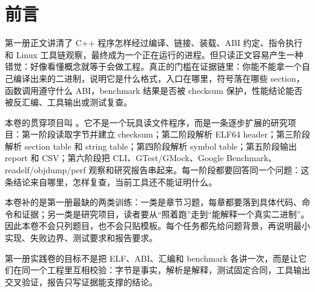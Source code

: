 \chapter*{前言}

第一册正文讲清了 C++ 程序怎样经过编译、链接、装载、ABI 约定、指令执行和 Linux 工具链观察，最终成为一个正在运行的进程。但只读正文容易产生一种错觉：好像看懂概念就等于会做工程。真正的门槛在证据链里：你能不能拿一个自己编译出来的二进制，说明它是什么格式，入口在哪里，符号落在哪些 section，函数调用遵守什么 ABI，benchmark 结果是否被 checksum 保护，性能结论能否被反汇编、工具输出或测试复查。

本卷的贯穿项目叫 。它不是一个玩具读文件程序，而是一条逐步扩展的研究项目：第一阶段读取字节并建立 checksum；第二阶段解析 ELF64 header；第三阶段解析 section table 和 string table；第四阶段解析 symbol table；第五阶段输出 report 和 CSV；第六阶段把 CLI、GTest/GMock、Google Benchmark、readelf/objdump/perf 观察和研究报告串起来。每一阶段都要回答同一个问题：这条结论来自哪里，怎样复查，当前工具还不能证明什么。

本卷补的是第一册最缺的两类训练：一类是章节习题，每章都要落到具体代码、命令和证据；另一类是研究项目，读者要从“照着跑”走到“能解释一个真实二进制”。因此本卷不会只列题目，也不会只贴模板。每个任务都先给问题背景，再说明最小实现、失败边界、测试要求和报告要求。

\begin{keyidea}
第一册实践卷的目标不是把 ELF、ABI、汇编和 benchmark 各讲一次，而是让它们在同一个工程里互相校验：字节是事实，解析是解释，测试固定合同，工具输出交叉验证，报告只写证据能支撑的结论。
\end{keyidea}

